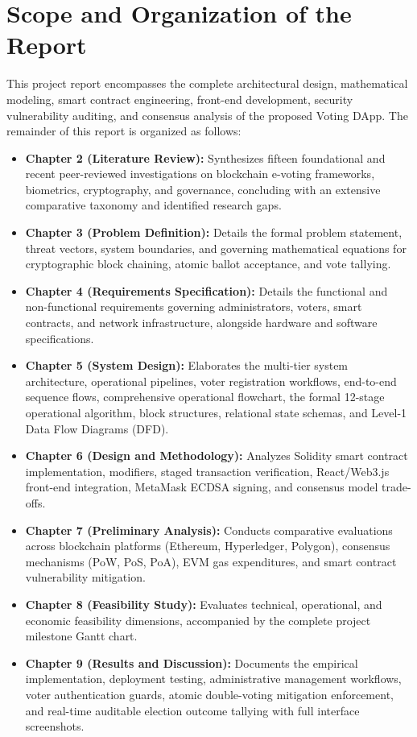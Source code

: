\documentclass[12pt,a4paper]{report}
\begin{document}
\section{Scope and Organization of the Report}
This project report encompasses the complete architectural design, mathematical modeling, smart contract engineering, front-end development, security vulnerability auditing, and consensus analysis of the proposed Voting DApp. The remainder of this report is organized as follows:
\begin{itemize}
    \item \textbf{Chapter 2 (Literature Review):} Synthesizes fifteen foundational and recent peer-reviewed investigations on blockchain e-voting frameworks, biometrics, cryptography, and governance, concluding with an extensive comparative taxonomy and identified research gaps.
    \item \textbf{Chapter 3 (Problem Definition):} Details the formal problem statement, threat vectors, system boundaries, and governing mathematical equations for cryptographic block chaining, atomic ballot acceptance, and vote tallying.
    \item \textbf{Chapter 4 (Requirements Specification):} Details the functional and non-functional requirements governing administrators, voters, smart contracts, and network infrastructure, alongside hardware and software specifications.
    \item \textbf{Chapter 5 (System Design):} Elaborates the multi-tier system architecture, operational pipelines, voter registration workflows, end-to-end sequence flows, comprehensive operational flowchart, the formal 12-stage operational algorithm, block structures, relational state schemas, and Level-1 Data Flow Diagrams (DFD).
    \item \textbf{Chapter 6 (Design and Methodology):} Analyzes Solidity smart contract implementation, modifiers, staged transaction verification, React/Web3.js front-end integration, MetaMask ECDSA signing, and consensus model trade-offs.
    \item \textbf{Chapter 7 (Preliminary Analysis):} Conducts comparative evaluations across blockchain platforms (Ethereum, Hyperledger, Polygon), consensus mechanisms (PoW, PoS, PoA), EVM gas expenditures, and smart contract vulnerability mitigation.
    \item \textbf{Chapter 8 (Feasibility Study):} Evaluates technical, operational, and economic feasibility dimensions, accompanied by the complete project milestone Gantt chart.
    \item \textbf{Chapter 9 (Results and Discussion):} Documents the empirical implementation, deployment testing, administrative management workflows, voter authentication guards, atomic double-voting mitigation enforcement, and real-time auditable election outcome tallying with full interface screenshots.

\end{itemize}
\end{document}
